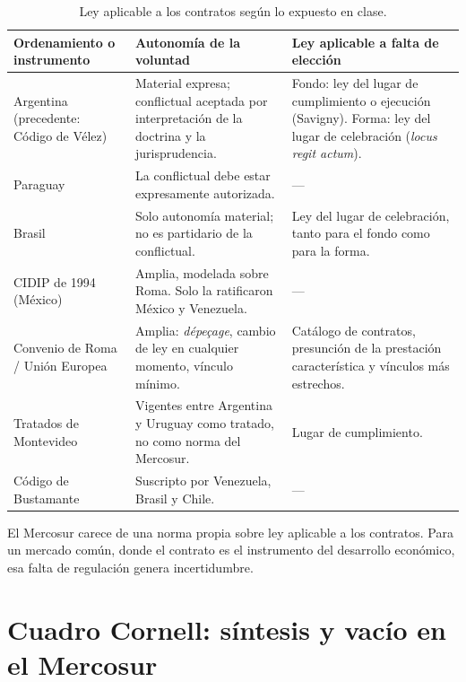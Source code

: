 \documentclass[12pt,oneside]{book}
\begin{document}
\begin{table}[H]
\centering
\small
\caption{Ley aplicable a los contratos según lo expuesto en clase.}
\begin{tabularx}{\textwidth}{>{\raggedright\arraybackslash}p{} Y Y}
\toprule
\textbf{Ordenamiento o instrumento} & \textbf{Autonomía de la voluntad} & \textbf{Ley aplicable a falta de elección} \\
\midrule
Argentina (precedente: Código de Vélez) & Material expresa; conflictual aceptada por interpretación de la doctrina y la jurisprudencia. & Fondo: ley del lugar de cumplimiento o ejecución (Savigny). Forma: ley del lugar de celebración (\textit{locus regit actum}). \\
Paraguay & La conflictual debe estar expresamente autorizada. & --- \\
Brasil & Solo autonomía material; no es partidario de la conflictual. & Ley del lugar de celebración, tanto para el fondo como para la forma. \\
CIDIP de 1994 (México) & Amplia, modelada sobre Roma. Solo la ratificaron México y Venezuela. & --- \\
Convenio de Roma / Unión Europea & Amplia: \textit{dépeçage}, cambio de ley en cualquier momento, vínculo mínimo. & Catálogo de contratos, presunción de la prestación característica y vínculos más estrechos. \\
Tratados de Montevideo & Vigentes entre Argentina y Uruguay como tratado, no como norma del Mercosur. & Lugar de cumplimiento. \\
Código de Bustamante & Suscripto por Venezuela, Brasil y Chile. & --- \\
\bottomrule
\end{tabularx}
\end{table}

\begin{important}
El Mercosur carece de una norma propia sobre ley aplicable a los contratos. Para un mercado común, donde el contrato es el instrumento del desarrollo económico, esa falta de regulación genera incertidumbre.
\end{important}

\section{Cuadro Cornell: síntesis y vacío en el Mercosur}
\end{document}

